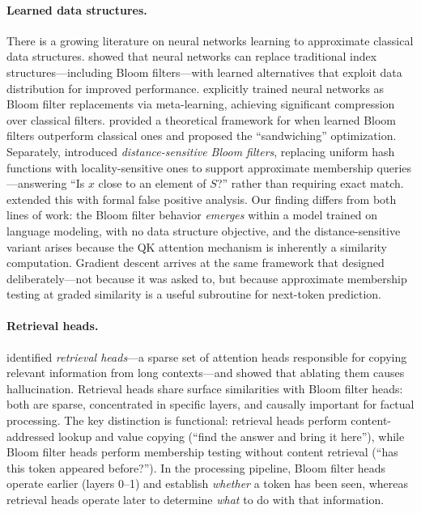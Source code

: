 \documentclass[11pt]{article}
\begin{document}
\paragraph{Learned data structures.}
There is a growing literature on neural networks learning to approximate classical data structures. \citet{kraska2018case} showed that neural networks can replace traditional index structures---including Bloom filters---with learned alternatives that exploit data distribution for improved performance. \citet{rae2019meta} explicitly trained neural networks as Bloom filter replacements via meta-learning, achieving significant compression over classical filters. \citet{mitzenmacher2018model} provided a theoretical framework for when learned Bloom filters outperform classical ones and proposed the ``sandwiching'' optimization. Separately, \citet{kirsch2006distance} introduced \emph{distance-sensitive Bloom filters}, replacing uniform hash functions with locality-sensitive ones to support approximate membership queries---answering ``Is $x$ close to an element of $S$?'' rather than requiring exact match. \citet{hua2012locality} extended this with formal false positive analysis. Our finding differs from both lines of work: the Bloom filter behavior \emph{emerges} within a model trained on language modeling, with no data structure objective, and the distance-sensitive variant arises because the QK attention mechanism is inherently a similarity computation. Gradient descent arrives at the same framework that \citet{kirsch2006distance} designed deliberately---not because it was asked to, but because approximate membership testing at graded similarity is a useful subroutine for next-token prediction.

\paragraph{Retrieval heads.}
\citet{wu2024retrieval} identified \emph{retrieval heads}---a sparse set of attention heads responsible for copying relevant information from long contexts---and showed that ablating them causes hallucination. Retrieval heads share surface similarities with Bloom filter heads: both are sparse, concentrated in specific layers, and causally important for factual processing. The key distinction is functional: retrieval heads perform content-addressed lookup and value copying (``find the answer and bring it here''), while Bloom filter heads perform membership testing without content retrieval (``has this token appeared before?''). In the processing pipeline, Bloom filter heads operate earlier (layers 0--1) and establish \emph{whether} a token has been seen, whereas retrieval heads operate later to determine \emph{what} to do with that information.
\end{document}
